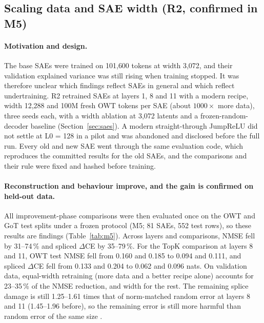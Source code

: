 

\subsection{Scaling data and SAE width (R2, confirmed in M5)}\label{sec:r2}

\paragraph{Motivation and design.} The base SAEs were trained on 101{,}600 tokens at width 3{,}072, and their
validation explained variance was still rising when training stopped. It was therefore unclear which findings reflect
SAEs in general and which reflect undertraining. R2 retrained SAEs at layers 1, 8 and 11 with a modern recipe, width
12{,}288 and 100M fresh OWT tokens per SAE (about $1000\times$ more data), three seeds each, with a width ablation at
3{,}072 latents and a frozen-random-decoder baseline (Section~\ref{sec:saes}). A modern straight-through JumpReLU did not
settle at L0 = 128 in a pilot and was abandoned and disclosed before the full run. Every old and new SAE went through
the same evaluation code, which reproduces the committed results for the old SAEs, and the comparisons and their rule
were fixed and hashed before training.

\paragraph{Reconstruction and behaviour improve, and the gain is confirmed on held-out data.} All improvement-phase
comparisons were then evaluated once on the OWT and GoT test splits under a frozen protocol (M5; 81 SAEs, 552 test
rows), so these results are  findings (Table~\ref{tab:m5}). Across layers and comparisons, NMSE
fell by 31--74\,\% and spliced $\Delta$CE by 35--79\,\%. For the TopK comparison at layers 8 and 11, OWT test NMSE fell
from 0.160 and 0.185 to 0.094 and 0.111, and spliced $\Delta$CE fell from 0.133 and 0.204 to 0.062 and 0.096 nats. On
validation data, equal-width retraining (more data and a better recipe alone) accounts for 23--35\,\% of the NMSE
reduction, and width for the rest. The remaining splice damage is still 1.25--1.61 times that of norm-matched random
error at layers 8 and 11 (1.45--1.96 before), so the remaining error is still more harmful than random error of the same
size \citep{engels2024darkmatter}.

